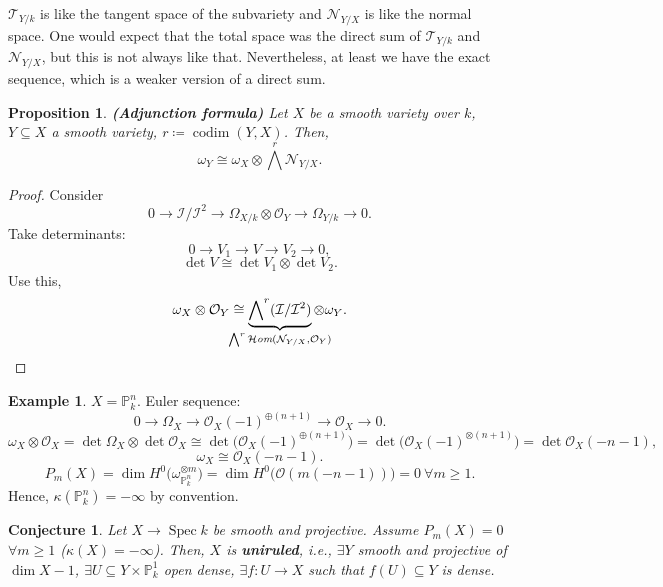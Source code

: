 \documentclass[12pt]{article}
\DeclareMathOperator{\Spec}{Spec}
\DeclareMathOperator{\shHom}{\mathcal{H}\textit{om}}
\DeclareMathOperator{\codim}{codim}
\newtheorem*{proposition}{Proposition}
\newtheorem*{conjecture}{Conjecture}
\theoremstyle{definition}
\newtheorem*{example}{Example}
\begin{document}
$\mathcal{T}_{Y/k}$ is like the tangent space of the subvariety and $\mathcal{N}_{Y/X}$ is like the normal space. One would expect that the total space was the direct sum of $\mathcal{T}_{Y/k}$ and $\mathcal{N}_{Y/X}$, but this is not always like that. Nevertheless, at least we have the exact sequence, which is a weaker version of a direct sum.

\begin{proposition}
\emph{\textbf{(Adjunction formula)}} Let $X$ be a smooth variety over $k$, $Y\subseteq X$ a smooth variety, $r\coloneqq\codim(Y,X)$. Then,
\[\omega_Y\cong\omega_X\otimes{\bigwedge}^r\mathcal{N}_{Y/X}.\]
\end{proposition}

\begin{proof}
Consider
\[0\longrightarrow\mathcal{I}/\mathcal{I}^2\longrightarrow\Omega_{X/k}\otimes\mathcal{O}_Y\longrightarrow\Omega_{Y/k}\longrightarrow0.\]
Take determinants:
\[0\longrightarrow V_1\longrightarrow V\longrightarrow V_2\longrightarrow0,\]
\[\det V\cong\det V_1\otimes\det V_2.\]
Use this,
\[\omega_X\otimes\mathcal{O}_Y\cong\underbrace{{\bigwedge}^r(\mathcal{I}/\mathcal{I}^2)}_{\mathclap{{\bigwedge}^r\shHom(\mathcal{N}_{Y/X},\mathcal{O}_Y)}}\otimes\omega_Y.\]
\end{proof}

\begin{example}
$X=\mathbb{P}_k^n$. Euler sequence:
\[0\longrightarrow\Omega_X\longrightarrow\mathcal{O}_X(-1)^{\oplus(n+1)}\longrightarrow\mathcal{O}_X\longrightarrow0.\]
\[\omega_X\otimes\mathcal{O}_X=\det\Omega_X\otimes\det\mathcal{O}_X\cong\det\big(\mathcal{O}_X(-1)^{\oplus(n+1)}\big)=\det\big(\mathcal{O}_X(-1)^{\otimes(n+1)}\big)=\det\mathcal{O}_X(-n-1),\]
\[\omega_X\cong\mathcal{O}_X(-n-1).\]
\[P_m(X)=\dim H^0\big(\omega_{\mathbb{P}_k^n}^{\otimes m}\big)=\dim H^0\big(\mathcal{O}(m(-n-1))\big)=0\ \forall m\geq1.\]
Hence, $\kappa(\mathbb{P}_k^n)=-\infty$ by convention.
\end{example}

\begin{conjecture}
Let $X\rightarrow\Spec k$ be smooth and projective. Assume $P_m(X)=0$ $\forall m\geq1$ ($\kappa(X)=-\infty$). Then, $X$ is \textbf{uniruled}, i.e., $\exists Y$ smooth and projective of $\dim X-1$, $\exists U\subseteq Y\times\mathbb{P}_k^1$ open dense, $\exists f:U\rightarrow X$ such that $f(U)\subseteq Y$ is dense.
\end{conjecture}
\end{document}
